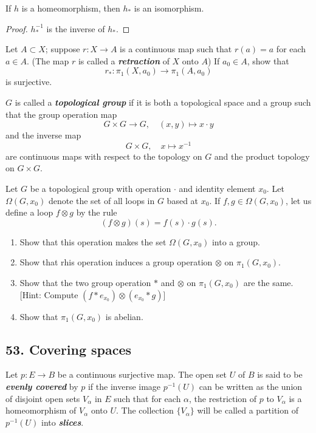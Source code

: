 \begin{mycorollary}
If $h$ is a homeomorphism, then $h_*$ is an isomorphism.
\end{mycorollary}
\begin{proof}
$h^{-1}_*$ is the inverse of $h_*$.
\end{proof}

\begin{myproposition}
[Exercise 4]
Let $A\subset X$; suppose $r:X\to A$ is a continuous map such that $r(a)=a$ for each $a\in A$. (The map $r$ is called a \textbf{\emph{retraction}} of $X$ onto $A$) If $a_0\in A$, show that
$$ r_*:\pi_1(X,a_0)\to \pi_1(A,a_0)$$
is surjective.
\end{myproposition}

\begin{mydefinition}
$G$ is called a \textbf{\emph{topological group}} if it is both a topological space and a group such that the group operation map
$$G\times G\to G,\quad (x,y)\mapsto x\cdot y$$
and the inverse map
$$G\times G,\quad x\mapsto x^{-1}$$
are continuous maps with respect to the topology on $G$ and the product topology on $G\times G$.
\end{mydefinition}

\begin{myproposition}
[Exercise 7]
Let $G$ be a topological group with operation $\cdot$ and identity element $x_0$. Let $\Omega (G,x_0)$ denote the set of all loops in $G$ based at $x_0$. If $f,g\in \Omega (G,x_0)$, let us define a loop $f\otimes g$ by the rule
$$(f\otimes g)(s)=f(s)\cdot g(s).$$
\begin{enumerate}[label={(\alph*)}]
\item Show that this operation makes the set $\Omega (G,x_0)$ into a group.
\item Show that rhis operation induces a group operation $\otimes$ on $\pi_1 (G,x_0)$.
\item Show that the two group operation $*$ and $\otimes$ on $\pi_1(G,x_0)$ are the same.[Hint: Compute $(f*e_{x_0})\otimes (e_{x_0}*g)$]
\item Show that $\pi_1(G,x_0)$ is abelian.
\end{enumerate}
\end{myproposition}

\subsection{53. Covering spaces}
\begin{mydefinition}
Let $p:E\to B$ be a continuous surjective map. The open set $U$ of $B$ is said to be \textbf{\emph{evenly covered}} by $p$ if the inverse image $p^{-1}(U)$ can be written as the union of disjoint open sets $V_\alpha$ in $E$ such that for each $\alpha$, the restriction of $p$ to $V_\alpha$ is a homeomorphism of $V_\alpha$ onto $U$. The collection $\{V_\alpha\}$ will be called a partition of $p^{-1}(U)$ into \textbf{\emph{slices}}.
\end{mydefinition}

